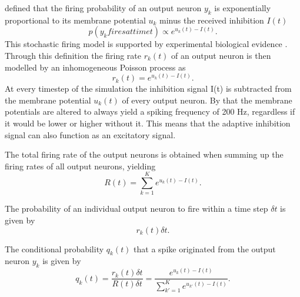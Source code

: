 \citet{nessler} defined that the firing probability of an output neuron  $y_k$ is exponentially proportional to its membrane potential $u_k$ minus the received inhibition $I(t)$
\begin{equation}
\label{eqn:pVonY}
p(y_k fires at time t) \propto e^{u_k(t) - I(t)}.
\end{equation}
This stochastic firing model is supported by experimental biological evidence \citep{woDasEHerkommt}. Through this definition the firing rate $r_k(t)$ of an output neuron is then modelled by an inhomogeneous Poisson process as
\begin{equation}
\label{eqn:rk}
r_k(t) = e^{u_k(t) - I(t)}.
\end{equation}
At every timestep of the simulation the inhibition signal I(t) is subtracted from the membrane potential $u_k(t)$ of every output neuron. By that the membrane potentials are altered to always yield a spiking frequency of 200 Hz, regardless if it would be lower or higher without it. This means that the adaptive inhibition signal can also function as an excitatory signal. 

The total firing rate of the output neurons is obtained when summing up the firing rates of all output neurons, yielding 
\begin{equation}
\label{eqn:R}
R(t) = \sum_{k=1}^K e^{u_k(t) - I(t)}.
\end{equation}

The probability of an individual output neuron to fire within a time step $\delta t$ is given by
\begin{equation}
\label{eqn:rkdt}
r_k(t) \delta t.
\end{equation}

The conditional probability $q_k(t)$ that a spike originated from the output neuron $y_k$ is given by
\begin{equation}
\label{eqn:qk}
q_k(t) = \frac{r_k(t) \delta t}{R(t) \delta t} = \frac{e^{u_k(t) - I(t)}}{\sum_{k'=1}^K e^{u_{k'}(t) - I(t)}}.
\end{equation}

